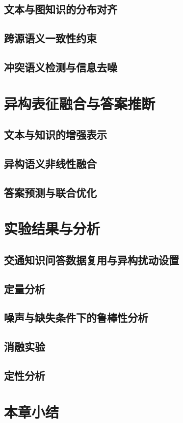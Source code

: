 \subsection{文本与图知识的分布对齐}

\subsection{跨源语义一致性约束}

\subsection{冲突语义检测与信息去噪}

\section{异构表征融合与答案推断}

\subsection{文本与知识的增强表示}

\subsection{异构语义非线性融合}

\subsection{答案预测与联合优化}

\section{实验结果与分析}

\subsection{交通知识问答数据复用与异构扰动设置}

\subsection{定量分析}

\subsection{噪声与缺失条件下的鲁棒性分析}

\subsection{消融实验}

\subsection{定性分析}

\section{本章小结}
